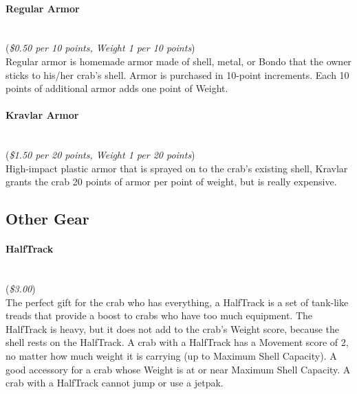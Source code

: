 \documentclass[a4paper,10pt]{article}
\begin{document}
\paragraph*{Regular Armor}
\label{sec:RegularArmor}
\hspace*{0px}\\(\textit{\$0.50 per 10 points, Weight 1 per 10 points})\\
Regular armor is homemade armor made of shell, metal, or Bondo that the owner sticks to his/her crab's shell. Armor is purchased in 10-point increments. Each 10 points of additional armor adds one point of Weight.

\paragraph*{Kravlar Armor}
\label{sec:KravlarArmor}
\hspace*{0px}\\(\textit{\$1.50 per 20 points, Weight 1 per 20 points})\\
High-impact plastic armor that is sprayed on to the crab's existing shell, Kravlar grants the crab 20 points of armor per point of weight, but is really expensive.

\subsection*{Other Gear}
\label{sec:OtherGear}

\paragraph*{HalfTrack}
\label{sec:HalfTrack}
\hspace*{0px}\\(\textit{\$3.00})\\
The perfect gift for the crab who has everything, a HalfTrack is a set of tank-like treads that provide a boost to crabs who have too much equipment. The HalfTrack is heavy, but it does not add to the crab's Weight score, because the shell rests on the HalfTrack. A crab with a HalfTrack has a Movement score of 2, no matter how much weight it is carrying (up to Maximum Shell Capacity). A good accessory for a crab whose Weight is at or near Maximum Shell Capacity. A crab with a HalfTrack cannot jump or use a jetpak.
\end{document}
